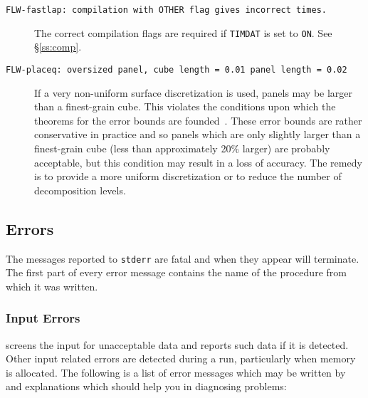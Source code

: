 \begin{description}
\item[{\tt FLW-fastlap: compilation with OTHER flag gives incorrect times.}]
The correct compilation flags are required if {\tt TIMDAT} is set to {\tt ON}.
See \S\ref{ss:comp}.

\item[{\tt FLW-placeq: oversized panel, cube length = 0.01 panel 
length = 0.02}\quad] 
If a very non-uniform surface discretization is used, panels may be larger
than a finest-grain cube.  This violates the conditions upon which the 
theorems for the error bounds are founded~\cite{greeng87}.  These error 
bounds are rather conservative in practice and so panels which are only 
slightly larger than a   finest-grain cube (less than approximately 20\% larger) 
are probably acceptable, but this condition may result in a loss of accuracy.
The remedy is to 
provide a more uniform discretization or to reduce the number of decomposition 
levels. 

\end{description}

\subsection{Errors}
\label{ss:error}

The messages reported to {\tt stderr} are fatal and when they appear
\fas will terminate.  The first part of every 
error message contains the name of the procedure from which it was 
written.  

\subsubsection{Input Errors}

\fas screens the input for unacceptable data and reports such data if
it is detected.  Other input related errors are detected during a run,
particularly when memory is allocated.   The following is a list of 
error messages which may be written by \fas and explanations which 
should help you in diagnosing problems:

